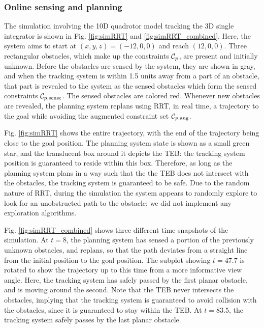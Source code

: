 \subsubsection{Online sensing and planning}
The simulation involving the 10D quadrotor model tracking the 3D single integrator is shown in Fig. \ref{fig:simRRT} and \ref{fig:simRRT_combined}.
Here, the system aims to start at $(x,y,z) = (-12, 0, 0)$ and reach $(12, 0, 0)$. 
Three rectangular obstacles, which make up the constraints $\mathcal C_p$, are present and initially unknown.
Before the obstacles are sensed by the system, they are shown in gray, and when the tracking system is within 1.5 units away from a part of an obstacle, that part is revealed to the system as the sensed obstacles which form the sensed constraints $\mathcal C_{p,\text{sense}}$.
The sensed obstacles are colored red.
Whenever new obstacles are revealed, the planning system replans using RRT, in real time, a trajectory to the goal while avoiding the augmented constraint set $\mathcal C_{p,\text{aug}}$.

Fig. \ref{fig:simRRT} shows the entire trajectory, with the end of the trajectory being close to the goal position.
The planning system state is shown as a small green star, and the translucent box around it depicts the TEB: the tracking system position is guaranteed to reside within this box.
Therefore, as long as the planning system plans in a way such that the the TEB does not intersect with the obstacles, the tracking system is guaranteed to be safe.
Due to the random nature of RRT, during the simulation the system appears to randomly explore to look for an unobstructed path to the obstacle; we did not implement any exploration algorithms.

Fig. \ref{fig:simRRT_combined} shows three different time snapshots of the simulation.
At $t=8$, the planning system has sensed a portion of the previously unknown obstacles, and replans, so that the path deviates from a straight line from the initial position to the goal position.
The subplot showing $t = 47.7$ is rotated to show the trajectory up to this time from a more informative view angle.
Here, the tracking system has safely passed by the first planar obstacle, and is moving around the second. 
Note that the TEB never intersects the obstacles, implying that the tracking system is guaranteed to avoid collision with the obstacles, since it is guaranteed to stay within the TEB.
At $t=83.5$, the tracking system safely passes by the last planar obstacle.

